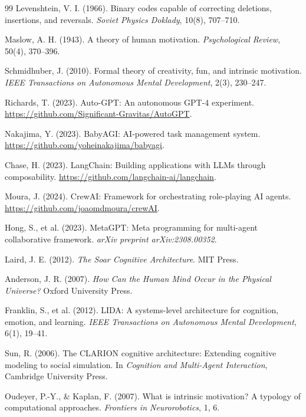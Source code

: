 \documentclass[12pt,a4paper]{report}
\begin{document}
\begin{thebibliography}{99}
Levenshtein, V. I. (1966).
Binary codes capable of correcting deletions, insertions, and reversals.
\textit{Soviet Physics Doklady}, 10(8), 707--710.

Maslow, A. H. (1943).
A theory of human motivation.
\textit{Psychological Review}, 50(4), 370--396.

Schmidhuber, J. (2010).
Formal theory of creativity, fun, and intrinsic motivation.
\textit{IEEE Transactions on Autonomous Mental Development}, 2(3), 230--247.

Richards, T. (2023).
Auto-GPT: An autonomous GPT-4 experiment.
\url{https://github.com/Significant-Gravitas/AutoGPT}.

Nakajima, Y. (2023).
BabyAGI: AI-powered task management system.
\url{https://github.com/yoheinakajima/babyagi}.

Chase, H. (2023).
LangChain: Building applications with LLMs through composability.
\url{https://github.com/langchain-ai/langchain}.

Moura, J. (2024).
CrewAI: Framework for orchestrating role-playing AI agents.
\url{https://github.com/joaomdmoura/crewAI}.

Hong, S., et al. (2023).
MetaGPT: Meta programming for multi-agent collaborative framework.
\textit{arXiv preprint arXiv:2308.00352}.

Laird, J. E. (2012).
\textit{The Soar Cognitive Architecture}.
MIT Press.

Anderson, J. R. (2007).
\textit{How Can the Human Mind Occur in the Physical Universe?}
Oxford University Press.

Franklin, S., et al. (2012).
LIDA: A systems-level architecture for cognition, emotion, and learning.
\textit{IEEE Transactions on Autonomous Mental Development}, 6(1), 19--41.

Sun, R. (2006).
The CLARION cognitive architecture: Extending cognitive modeling to social simulation.
In \textit{Cognition and Multi-Agent Interaction}, Cambridge University Press.

Oudeyer, P.-Y., \& Kaplan, F. (2007).
What is intrinsic motivation? A typology of computational approaches.
\textit{Frontiers in Neurorobotics}, 1, 6.


\end{thebibliography}
\end{document}
